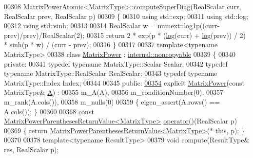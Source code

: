 \begin{DoxyCode}
00308 \hyperlink{class_eigen_1_1_matrix_power_atomic}{MatrixPowerAtomic<MatrixType>::computeSuperDiag}(RealScalar 
      curr, RealScalar prev, RealScalar p)
00309 \{
00310   \textcolor{keyword}{using} std::exp;
00311   \textcolor{keyword}{using} std::log;
00312   \textcolor{keyword}{using} std::sinh;
00313 
00314   RealScalar w = numext::log1p((curr-prev)/prev)/RealScalar(2);
00315   \textcolor{keywordflow}{return} 2 * exp(p * (\hyperlink{structlog}{log}(curr) + \hyperlink{structlog}{log}(prev)) / 2) * sinh(p * w) / (curr - prev);
00316 \}
00317 
00337 \textcolor{keyword}{template}<\textcolor{keyword}{typename} MatrixType>
00338 \textcolor{keyword}{class }\hyperlink{class_eigen_1_1_matrix_power}{MatrixPower} : \hyperlink{class_eigen_1_1internal_1_1noncopyable}{internal::noncopyable}
00339 \{
00340   \textcolor{keyword}{private}:
00341     \textcolor{keyword}{typedef} \textcolor{keyword}{typename} MatrixType::Scalar Scalar;
00342     \textcolor{keyword}{typedef} \textcolor{keyword}{typename} MatrixType::RealScalar RealScalar;
00343     \textcolor{keyword}{typedef} \textcolor{keyword}{typename} MatrixType::Index Index;
00344 
00345   \textcolor{keyword}{public}:
\hyperlink{class_eigen_1_1_matrix_power_a5eb445525601510413b53cd347c44716}{00354}     \textcolor{keyword}{explicit} \hyperlink{class_eigen_1_1_matrix_power_a5eb445525601510413b53cd347c44716}{MatrixPower}(\textcolor{keyword}{const} MatrixType& \hyperlink{group___core___module_class_eigen_1_1_matrix}{A}) :
00355       m\_A(A),
00356       m\_conditionNumber(0),
00357       m\_rank(A.cols()),
00358       m\_nulls(0)
00359     \{ eigen\_assert(A.rows() == A.cols()); \}
00360 
\hyperlink{class_eigen_1_1_matrix_power_a2ad22d156b1a7ff12d6c40a093cd95eb}{00368}     \textcolor{keyword}{const} \hyperlink{class_eigen_1_1_matrix_power_parentheses_return_value}{MatrixPowerParenthesesReturnValue<MatrixType>} 
      \hyperlink{class_eigen_1_1_matrix_power_a2ad22d156b1a7ff12d6c40a093cd95eb}{operator()}(RealScalar p)
00369     \{ \textcolor{keywordflow}{return} \hyperlink{class_eigen_1_1_matrix_power_parentheses_return_value}{MatrixPowerParenthesesReturnValue<MatrixType>}(*\textcolor{keyword}{
      this}, p); \}
00370 
00378     \textcolor{keyword}{template}<\textcolor{keyword}{typename} ResultType>
00379     \textcolor{keywordtype}{void} compute(ResultType& res, RealScalar p);

\end{DoxyCode}
